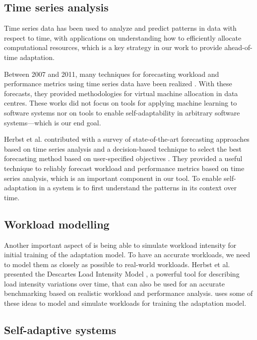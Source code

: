 \subsection{Time series analysis}

Time series data has been used to analyze and predict patterns in data with respect to time, with applications on understanding how to efficiently allocate computational resources, which is a key strategy in our work to provide ahead-of-time adaptation.

Between 2007 and 2011, many techniques for forecasting workload and performance metrics using time series data have been realized \cite{gmach2007workload, towards_autonomic_allocation, bobroff2007dynamic, meng2010efficient, caron2011pattern}. With these forecasts, they provided methodologies for virtual machine allocation in data centres. These works did not focus on tools for applying machine learning to software systems nor on tools to enable self-adaptability in arbitrary software systems---which is our end goal.

Herbst et al. contributed with a survey of state-of-the-art forecasting approaches based on time series analysis and a decision-based technique to select the best forecasting method based on user-specified objectives \cite{herbst_self-adaptive_2014}. They provided a useful technique to reliably forecast workload and performance metrics based on time series analysis, which is an important component in our tool. To enable self-adaptation in a system is to first understand the patterns in its context over time.

\subsection{Workload modelling}

Another important aspect of \projectname{} is being able to simulate workload intensity for initial training of the adaptation model. To have an accurate workloads, we need to model them as closely as possible to real-world workloads. Herbst et al. presented the Descartes Load Intensity Model \cite{kistowski_modeling_2017}, a powerful tool for describing load intensity variations over time, that can also be used for an accurate benchmarking based on realistic workload and performance analysis. \projectname{} uses some of these ideas to model and simulate workloads for training the adaptation model.

\subsection{Self-adaptive systems}

